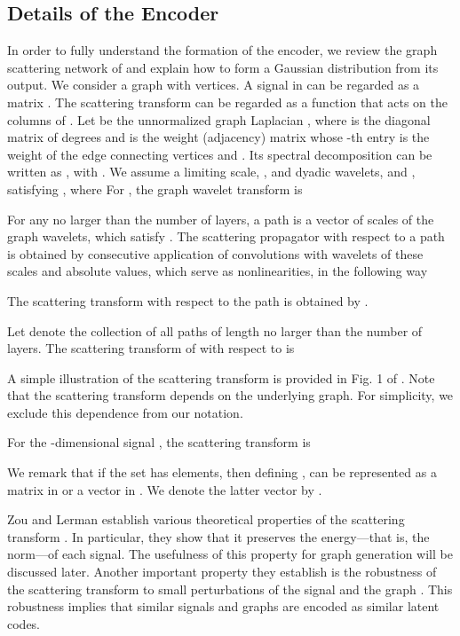 \documentclass[conference]{IEEEtran}
\begin{document}
\subsection{Details of the Encoder}
\label{sec:graph_scat_encode}
In order to fully understand the formation of the encoder, we review the graph scattering network of \cite{zou2018graph} and explain how to form a Gaussian distribution from its output. We consider a graph  with  vertices. A signal in  can be regarded as a matrix . The scattering transform can be regarded as a function that acts on the columns of .
Let  be the unnormalized graph Laplacian , where  is the diagonal matrix of degrees and  is the weight (adjacency) matrix whose -th entry is the weight of the edge connecting vertices  and . Its spectral decomposition can be written as 
, with . 
We assume a limiting scale, , and dyadic wavelets,  and , satisfying , 
where 
For , the graph wavelet transform \cite{hammond2011wavelets}
is


For any  no larger than the number of layers, a path  is a vector of  scales of the graph wavelets, which satisfy . The scattering propagator with respect to a path  is obtained by consecutive application of convolutions with wavelets of these scales and absolute values, which serve as nonlinearities, in the following way 

The scattering transform with respect to the path  is obtained by 
.

Let  denote the collection of all paths of length no larger than the number of layers. The scattering transform of  with respect to  is

A simple illustration of the scattering transform is provided in Fig. 1 of \cite{zou2018graph}. Note that the scattering transform depends on the underlying graph. For simplicity, we exclude this dependence from our notation.

For the -dimensional signal , the scattering transform is

We remark that if the set  has  elements, then defining ,  can be represented as a matrix in  or a vector in  . We denote the latter vector by .

Zou and Lerman \cite{zou2018graph} establish various theoretical properties of the scattering transform . In particular, they show that it preserves the energy---that is, the  norm---of each signal. The usefulness of this property for graph generation will be discussed later. Another important property they establish is the robustness of the scattering transform to small perturbations of the signal and the graph \cite[\S 5]{zou2018graph}. This robustness implies that similar signals and graphs are encoded as similar latent codes. 
\end{document}
